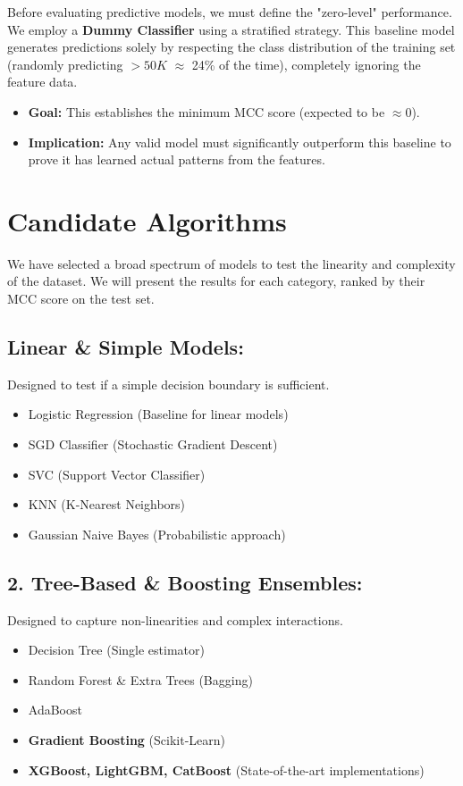 Before evaluating predictive models, we must define the "zero-level" performance. We employ a \textbf{Dummy Classifier} using a stratified strategy.
This baseline model generates predictions solely by respecting the class distribution of the training set (randomly predicting $>50K$ $\approx$ 24\%
of the time), completely ignoring the feature data.
\begin{itemize}
    \item \textbf{Goal:} This establishes the minimum MCC score (expected to be $\approx 0$).
    \item \textbf{Implication:} Any valid model must significantly outperform this baseline to prove it has learned actual patterns from the features.
\end{itemize}

\section{Candidate Algorithms}

We have selected a broad spectrum of models to test the linearity and complexity of the dataset. We will present the results for each
category, ranked by their MCC score on the test set.

\subsection{Linear \& Simple Models:}
Designed to test if a simple decision boundary is sufficient.
\begin{itemize}
    \item Logistic Regression (Baseline for linear models)
    \item SGD Classifier (Stochastic Gradient Descent)
    \item SVC (Support Vector Classifier)
    \item KNN (K-Nearest Neighbors)
    \item Gaussian Naive Bayes (Probabilistic approach)
\end{itemize}

\subsection{2. Tree-Based \& Boosting Ensembles:}
Designed to capture non-linearities and complex interactions.
\begin{itemize}
    \item Decision Tree (Single estimator)
    \item Random Forest \& Extra Trees (Bagging)
    \item AdaBoost
    \item \textbf{Gradient Boosting} (Scikit-Learn)
    \item \textbf{XGBoost, LightGBM, CatBoost} (State-of-the-art implementations)
\end{itemize}


